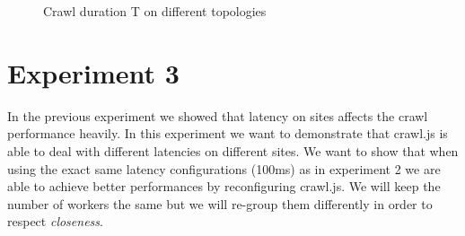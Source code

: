 \begin{figure}
  \centering
  \caption{Crawl duration T on different topologies}
  \label{plot:exp_002}
\end{figure}

\section{Experiment 3}

In the previous experiment we showed that latency on sites affects the crawl performance heavily. In this experiment we want to demonstrate that crawl.js is able to deal with different latencies on different sites. We want to show that when using the exact same latency configurations (100ms) as in experiment 2 we are able to achieve better performances by reconfiguring crawl.js. We will keep the number of workers the same but we will re-group them differently in order to respect \emph{closeness}.

